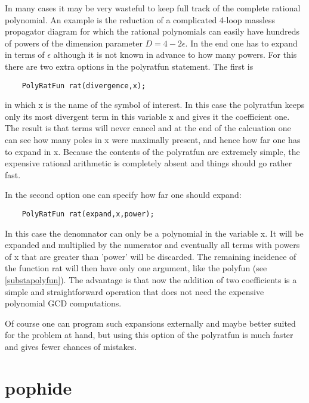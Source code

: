 \noindent In many cases it may be very wasteful to keep full track of the 
complete rational polynomial. An example is the reduction of a complicated 
4-loop massless propagator diagram for which the rational polynomials can 
easily have hundreds of powers of the dimension parameter $D=4-2\epsilon$. 
In the end one has to expand in terms of $\epsilon$ although it is not 
known in advance to how many powers. For this there are two extra options 
in the polyratfun statement. The first is
\begin{verbatim}
    PolyRatFun rat(divergence,x);
\end{verbatim}
in which x is the name of the symbol of interest. In this case the 
polyratfun keeps only its most divergent term in this variable x and gives 
it the coefficient one. The result is that terms will never cancel and at 
the end of the calcuation one can see how many poles in x were maximally 
present, and hence how far one has to expand in x. Because the contents of 
the polyratfun are extremely simple, the expensive rational arithmetic is 
completely absent and things should go rather fast.

\noindent In the second option one can specify how far one should expand:
\begin{verbatim}
    PolyRatFun rat(expand,x,power);
\end{verbatim}
In this case the denomnator can only be a polynomial in the variable x. It 
will be expanded and multiplied by the numerator and eventually all terms 
with powers of x that are greater than 'power' will be discarded. The 
remaining incidence of the function rat will then have only one argument, 
like the polyfun (see \ref{substapolyfun}). The advantage is that now the 
addition of two coefficients is a simple and straightforward operation that 
does not need the expensive polynomial GCD computations.

\noindent Of course one can program such expansions externally and maybe 
better suited for the problem at hand, but using this option of the 
polyratfun is much faster and gives fewer chances of mistakes.

\vspace{10mm}


\section{pophide}
\label{substapophide}

